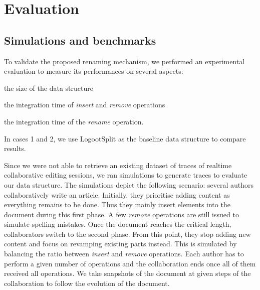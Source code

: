 \documentclass[sigplan,10pt]{acmart}
\begin{document}
\section{Evaluation}

\subsection{Simulations and benchmarks}

To validate the proposed renaming mechanism, we performed an experimental evaluation to measure its performances on several aspects:
\begin{enumerate*}
    \item the size of the data structure
    \item the integration time of \emph{insert} and \emph{remove} operations
    \item the integration time of the \emph{rename} operation.
\end{enumerate*}
In cases 1 and 2, we use LogootSplit as the baseline data structure to compare results.

Since we were not able to retrieve an existing dataset of traces of realtime collaborative editing sessions, we ran simulations to generate traces to evaluate our data structure.
The simulations depict the following scenario: several authors collaboratively write an article.
Initially, they prioritise adding content as everything remains to be done.
Thus they mainly insert elements into the document during this first phase.
A few \emph{remove} operations are still issued to simulate spelling mistakes.
Once the document reaches the critical length, collaborators switch to the second phase.
From this point, they stop adding new content and focus on revamping existing parts instead.
This is simulated by balancing the ratio between \emph{insert} and \emph{remove} operations.
Each author has to perform a given number of operations and the collaboration ends once all of them received all operations.
We take snapshots of the document at given steps of the collaboration to follow the evolution of the document.
\end{document}
